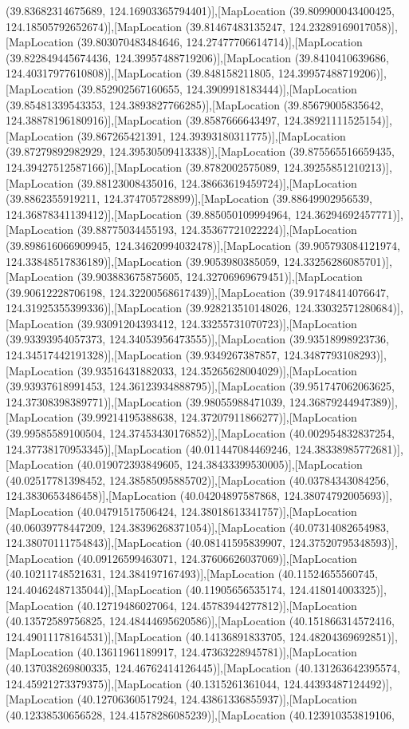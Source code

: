 (39.83682314675689, 124.16903365794401)],[MapLocation (39.809900043400425, 124.18505792652674)],[MapLocation (39.81467483135247, 124.23289169017058)],[MapLocation (39.803070483484646, 124.27477706614714)],[MapLocation (39.822849445674436, 124.39957488719206)],[MapLocation (39.8410410639686, 124.40317977610808)],[MapLocation (39.848158211805, 124.39957488719206)],[MapLocation (39.852902567160655, 124.3909918183444)],[MapLocation (39.85481339543353, 124.3893827766285)],[MapLocation (39.85679005835642, 124.38878196180916)],[MapLocation (39.8587666643497, 124.38921111525154)],[MapLocation (39.867265421391, 124.39393180311775)],[MapLocation (39.87279892982929, 124.39530509413338)],[MapLocation (39.875565516659435, 124.39427512587166)],[MapLocation (39.8782002575089, 124.39255851210213)],[MapLocation (39.88123008435016, 124.38663619459724)],[MapLocation (39.8862355919211, 124.374705728899)],[MapLocation (39.88649902956539, 124.36878341139412)],[MapLocation (39.885050109994964, 124.36294692457771)],[MapLocation (39.88775034455193, 124.35367721022224)],[MapLocation (39.898616066909945, 124.34620994032478)],[MapLocation (39.905793084121974, 124.33848517836189)],[MapLocation (39.9053980385059, 124.33256286085701)],[MapLocation (39.903883675875605, 124.32706969679451)],[MapLocation (39.90612228706198, 124.32200568617439)],[MapLocation (39.91748414076647, 124.31925355399336)],[MapLocation (39.928213510148026, 124.33032571280684)],[MapLocation (39.93091204393412, 124.33255731070723)],[MapLocation (39.93393954057373, 124.34053956473555)],[MapLocation (39.93518998923736, 124.34517442191328)],[MapLocation (39.9349267387857, 124.3487793108293)],[MapLocation (39.93516431882033, 124.35265628004029)],[MapLocation (39.93937618991453, 124.36123934888795)],[MapLocation (39.951747062063625, 124.37308398389771)],[MapLocation (39.98055988471039, 124.36879244947389)],[MapLocation (39.99214195388638, 124.37207911866277)],[MapLocation (39.99585589100504, 124.37453430176852)],[MapLocation (40.002954832837254, 124.37738170953345)],[MapLocation (40.011447084469246, 124.38338985772681)],[MapLocation (40.019072393849605, 124.38433399530005)],[MapLocation (40.02517781398452, 124.38585095885702)],[MapLocation (40.03784343084256, 124.3830653486458)],[MapLocation (40.04204897587868, 124.38074792005693)],[MapLocation (40.04791517506424, 124.38018613341757)],[MapLocation (40.06039778447209, 124.38396268371054)],[MapLocation (40.07314082654983, 124.38070111754843)],[MapLocation (40.08141595839907, 124.37520795348593)],[MapLocation (40.09126599463071, 124.37606626037069)],[MapLocation (40.10211748521631, 124.384197167493)],[MapLocation (40.11524655560745, 124.40462487135044)],[MapLocation (40.11905656535174, 124.418014003325)],[MapLocation (40.12719486027064, 124.45783944277812)],[MapLocation (40.13572589756825, 124.48444695620586)],[MapLocation (40.151866314572416, 124.49011178164531)],[MapLocation (40.14136891833705, 124.48204369692851)],[MapLocation (40.13611961189917, 124.47363228945781)],[MapLocation (40.137038269800335, 124.46762414126445)],[MapLocation (40.131263642395574, 124.45921273379375)],[MapLocation (40.1315261361044, 124.44393487124492)],[MapLocation (40.12706360517924, 124.43861336855937)],[MapLocation (40.12338530656528, 124.41578286085239)],[MapLocation (40.123910353819106, 